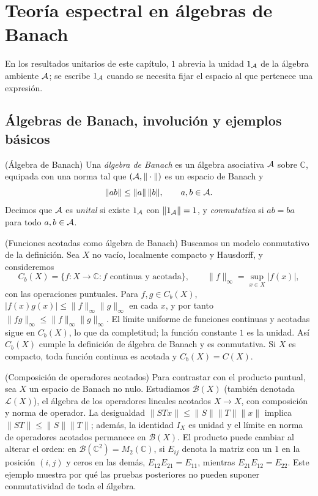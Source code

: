 \chapter{Teoría espectral en álgebras de Banach}

En los resultados unitarios de este capítulo, $1$ abrevia la unidad $1_\mathcal A$ de
la álgebra ambiente $\mathcal A$; se escribe $1_\mathcal A$ cuando se necesita fijar el
espacio al que pertenece una expresión.

\section{Álgebras de Banach, involución y ejemplos básicos}

\begin{cthdefinicion}{(Álgebra de Banach)}
Una \emph{álgebra de Banach} es un álgebra asociativa $\mathcal A$ sobre $\mathbb C$, equipada con una
norma tal que $(\mathcal A,\|\cdot\|)$ es un espacio de Banach y
\[
  \|ab\|\le \|a\|\,\|b\|,\qquad a,b\in\mathcal A.
\]
Decimos que $\mathcal A$ es \emph{unital} si existe $1_\mathcal A$ con $\|1_\mathcal A\|=1$, y \emph{conmutativa} si
$ab=ba$ para todo $a,b\in\mathcal A$.
\end{cthdefinicion}

\begin{cthejemplo}{(Funciones acotadas como álgebra de Banach)}
Buscamos un modelo conmutativo de la definición. Sea $X$ no vacío,
localmente compacto y Hausdorff, y consideremos
\[
 C_b(X)=\{f:X\to\mathbb C: f\text{ continua y acotada}\},\qquad
 \|f\|_\infty=\sup_{x\in X}|f(x)|,
\]
con las operaciones puntuales. Para $f,g\in C_b(X)$,
$|f(x)g(x)|\le\|f\|_\infty\|g\|_\infty$ en cada $x$, y por tanto
$\|fg\|_\infty\le\|f\|_\infty\|g\|_\infty$.
El límite uniforme de funciones continuas y acotadas sigue en $C_b(X)$,
lo que da completitud; la función constante $1$ es la unidad.
Así $C_b(X)$ cumple la definición de álgebra de Banach y es conmutativa.
Si $X$ es compacto, toda función continua es acotada y $C_b(X)=C(X)$.
\end{cthejemplo}

\begin{cthejemplo}{(Composición de operadores acotados)}
Para contrastar con el producto puntual, sea $X$ un espacio de Banach no nulo.
Estudiamos $\mathcal B(X)$ (también denotada $\mathcal L(X)$), el álgebra
de los operadores lineales acotados $X\to X$, con composición y norma de
operador. La desigualdad $\|STx\|\le\|S\|\|T\|\|x\|$ implica
$\|ST\|\le\|S\|\|T\|$; además, la identidad $I_X$ es unidad y
el límite en norma de operadores acotados permanece en $\mathcal B(X)$.
El producto puede cambiar al alterar el orden: en
$\mathcal B(\mathbb C^2)=M_2(\mathbb C)$, si $E_{ij}$ denota la matriz
con un $1$ en la posición $(i,j)$ y ceros en las demás,
$E_{12}E_{21}=E_{11}$, mientras $E_{21}E_{12}=E_{22}$.
Este ejemplo muestra por qué las pruebas posteriores no pueden suponer
conmutatividad de toda el álgebra.
\end{cthejemplo}


